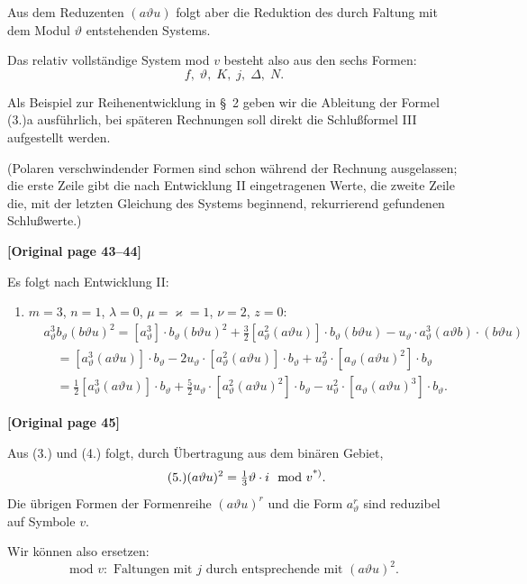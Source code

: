 \documentclass[12pt,a4paper]{article}
\begin{document}
Aus dem Reduzenten $(a\vartheta u)$ folgt aber die Reduktion des durch Faltung mit dem Modul $\vartheta$ entstehenden Systems.

Das relativ vollständige System mod $v$ besteht also aus den sechs Formen:
\[f, \; \vartheta, \; K, \; j, \; \varDelta, \; N.\]

Als Beispiel zur Reihenentwicklung in \S\ 2 geben wir die Ableitung der Formel (3.)a ausführlich, bei späteren Rechnungen soll direkt die Schlußformel III aufgestellt werden.

(Polaren verschwindender Formen sind schon während der Rechnung ausgelassen; die erste Zeile gibt die nach Entwicklung II eingetragenen Werte, die zweite Zeile die, mit der letzten Gleichung des Systems beginnend, rekurrierend gefundenen Schlußwerte.)

\noindent\textbf{[Original page 43--44]}

Es folgt nach Entwicklung II:
\begin{enumerate}
\item[1)] $m=3$, $n=1$, $\lambda=0$, $\mu=\varkappa=1$, $\nu=2$, $z=0$:
\begin{align*}
&a_\vartheta^3 b_\vartheta (b\vartheta u)^2 = [a_\vartheta^3] \cdot b_\vartheta (b\vartheta u)^2 + \tfrac{3}{2} [a_\vartheta^2 (a\vartheta u)] \cdot b_\vartheta (b\vartheta u) - u_\vartheta \cdot a_\vartheta^3 (a\vartheta b) \cdot (b\vartheta u)\\
&\quad = [a_\vartheta^3 (a\vartheta u)] \cdot b_\vartheta - 2u_\vartheta \cdot [a_\vartheta^2 (a\vartheta u)] \cdot b_\vartheta + u_\vartheta^2 \cdot [a_\vartheta (a\vartheta u)^2] \cdot b_\vartheta\\
&\quad = \tfrac{1}{2} [a_\vartheta^3 (a\vartheta u)] \cdot b_\vartheta + \tfrac{5}{2} u_\vartheta \cdot [a_\vartheta^2 (a\vartheta u)^2] \cdot b_\vartheta - u_\vartheta^2 \cdot [a_\vartheta (a\vartheta u)^3] \cdot b_\vartheta.
\end{align*}
\end{enumerate}

\noindent\textbf{[Original page 45]}

Aus (3.) und (4.) folgt, durch Übertragung aus dem binären Gebiet,
\begin{equation}\tag{5.}
(a\vartheta u)^2 = \tfrac{1}{3}\vartheta \cdot i \mod v\textsuperscript{*)}.
\end{equation}
Die übrigen Formen der Formenreihe $(a\vartheta u)^r$ und die Form $a_\vartheta^r$ sind reduzibel auf Symbole $v$.

Wir können also ersetzen:
\[\text{mod } v: \text{ Faltungen mit } j \text{ durch entsprechende mit } (a\vartheta u)^2.\]
\end{document}
